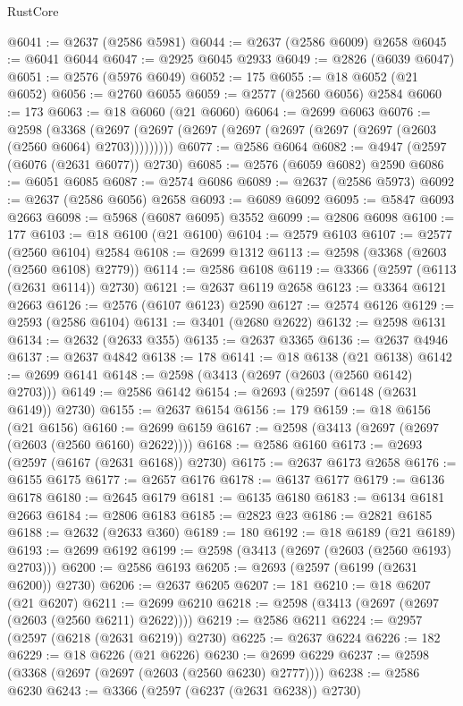 \begin{lexlean}{RustCore}
\begin{coremodule}
@6041 := @2637 (@2586 @5981)
@6044 := @2637 (@2586 @6009) @2658
@6045 := @6041 @6044
@6047 := @2925 @6045 @2933
@6049 := @2826 (@6039 @6047)
@6051 := @2576 (@5976 @6049)
@6052 := 175
@6055 := @18 @6052 (@21 @6052)
@6056 := @2760 @6055
@6059 := @2577 (@2560 @6056) @2584
@6060 := 173
@6063 := @18 @6060 (@21 @6060)
@6064 := @2699 @6063
@6076 := @2598
    (@3368 (@2697 (@2697 (@2697 (@2697 (@2697 (@2697 (@2697 (@2603 (@2560 @6064) @2703)))))))))
@6077 := @2586 @6064
@6082 := @4947 (@2597 (@6076 (@2631 @6077)) @2730)
@6085 := @2576 (@6059 @6082) @2590
@6086 := @6051 @6085
@6087 := @2574 @6086
@6089 := @2637 (@2586 @5973)
@6092 := @2637 (@2586 @6056) @2658
@6093 := @6089 @6092
@6095 := @5847 @6093 @2663
@6098 := @5968 (@6087 @6095) @3552
@6099 := @2806 @6098
@6100 := 177
@6103 := @18 @6100 (@21 @6100)
@6104 := @2579 @6103
@6107 := @2577 (@2560 @6104) @2584
@6108 := @2699 @1312
@6113 := @2598 (@3368 (@2603 (@2560 @6108) @2779))
@6114 := @2586 @6108
@6119 := @3366 (@2597 (@6113 (@2631 @6114)) @2730)
@6121 := @2637 @6119 @2658
@6123 := @3364 @6121 @2663
@6126 := @2576 (@6107 @6123) @2590
@6127 := @2574 @6126
@6129 := @2593 (@2586 @6104)
@6131 := @3401 (@2680 @2622)
@6132 := @2598 @6131
@6134 := @2632 (@2633 @355)
@6135 := @2637 @3365
@6136 := @2637 @4946
@6137 := @2637 @4842
@6138 := 178
@6141 := @18 @6138 (@21 @6138)
@6142 := @2699 @6141
@6148 := @2598 (@3413 (@2697 (@2603 (@2560 @6142) @2703)))
@6149 := @2586 @6142
@6154 := @2693 (@2597 (@6148 (@2631 @6149)) @2730)
@6155 := @2637 @6154
@6156 := 179
@6159 := @18 @6156 (@21 @6156)
@6160 := @2699 @6159
@6167 := @2598 (@3413 (@2697 (@2697 (@2603 (@2560 @6160) @2622))))
@6168 := @2586 @6160
@6173 := @2693 (@2597 (@6167 (@2631 @6168)) @2730)
@6175 := @2637 @6173 @2658
@6176 := @6155 @6175
@6177 := @2657 @6176
@6178 := @6137 @6177
@6179 := @6136 @6178
@6180 := @2645 @6179
@6181 := @6135 @6180
@6183 := @6134 @6181 @2663
@6184 := @2806 @6183
@6185 := @2823 @23
@6186 := @2821 @6185
@6188 := @2632 (@2633 @360)
@6189 := 180
@6192 := @18 @6189 (@21 @6189)
@6193 := @2699 @6192
@6199 := @2598 (@3413 (@2697 (@2603 (@2560 @6193) @2703)))
@6200 := @2586 @6193
@6205 := @2693 (@2597 (@6199 (@2631 @6200)) @2730)
@6206 := @2637 @6205
@6207 := 181
@6210 := @18 @6207 (@21 @6207)
@6211 := @2699 @6210
@6218 := @2598 (@3413 (@2697 (@2697 (@2603 (@2560 @6211) @2622))))
@6219 := @2586 @6211
@6224 := @2957 (@2597 (@6218 (@2631 @6219)) @2730)
@6225 := @2637 @6224
@6226 := 182
@6229 := @18 @6226 (@21 @6226)
@6230 := @2699 @6229
@6237 := @2598 (@3368 (@2697 (@2697 (@2603 (@2560 @6230) @2777))))
@6238 := @2586 @6230
@6243 := @3366 (@2597 (@6237 (@2631 @6238)) @2730)

\end{coremodule}
\end{lexlean}
